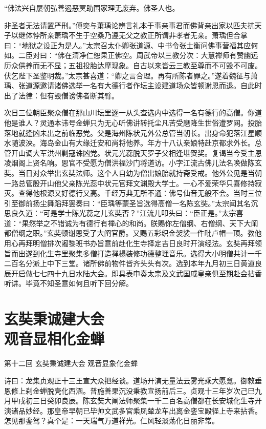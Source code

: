 \documentclass[12pt,UTF8]{ctexbook}
\begin{document}
{“佛法兴自屡朝弘善遏恶冥助国家理无废弃。佛圣人也。

非圣者无法请置严刑。”傅奕与萧瑀论辨言礼本于事亲事君而佛背亲出家以匹夫抗天子以继体悖所亲萧瑀不生于空桑乃遵无父之教正所谓非孝者无亲。萧瑀但合掌曰：“地狱之设正为是人。”太宗召太仆卿张道源、中书令张士衡问佛事营福其应何如。二臣对曰：“佛在清净仁恕果正佛空。周武帝以三教分次：大慧禅师有赞幽远历众供养而无不显；五祖投胎达摩现象。自古以来皆云三教至尊而不可毁不可废。伏乞陛下圣鉴明裁。”太宗甚喜道：“卿之言合理。再有所陈者罪之。”遂着魏征与萧瑀、张道源邀请诸佛选举一名有大德行者作坛主设建道场众皆顿谢恩而退。自此时出了法律：但有毁僧谤佛者断其臂。

次日三位朝臣聚众僧在那山川坛里逐一从头查选内中选得一名有德行的高僧。你道他是谁人？灵通本讳号金蝉只为无心听佛讲转托尘凡苦受磨降生世俗遭罗网。投胎落地就逢凶未出之前临恶党。父是海州陈状元外公总管当朝长。出身命犯落江星顺水随波泱。海岛金山有大缘迁安和尚将他养。年方十八认亲娘特赴京都求外长。总管开山调大军洪州剿寇诛凶党。状元光蕊脱天罗子父相逢堪贺奖。复谒当今受主恩凌烟阁上贤名响。恩官不受愿为僧洪福沙门将道访。小字江流古佛儿法名唤做陈玄奘。当日对众举出玄奘法师。这个人自幼为僧出娘胎就持斋受戒。他外公见是当朝一路总管殷开山他父亲陈光蕊中状元官拜文渊殿大学士。一心不爱荣华只喜修持寂灭。查得他根源又好德行又高。千经万典无所不通：佛号仙音无般不会。当时三位引至御前扬尘舞蹈拜罢奏曰：“臣瑀等蒙圣旨选得高僧一名陈玄奘。”太宗闻其名沉思良久道：“可是学士陈光蕊之儿玄奘否？”江流儿叩头曰：“臣正是。”太宗喜道：“果然举之不错诚为有德行有禅心的和尚。朕赐你左僧纲、右僧纲、天下大阐都僧纲之职。”玄奘顿谢恩受了大阐官爵。又赐五彩织金袈裟一件毗卢帽一顶。教他用心再拜明僧排次阇黎班书办旨意前赴化生寺择定吉日良时开演经法。玄奘再拜领旨而出遂到化生寺里聚集多僧打造禅榻装修功德整理音乐。选得大小明僧共计一千二百名分派上中下三堂。诸所佛前物件皆齐头头有次。选到本年九月初三日黄道良辰开启做七七四十九日水陆大会。即具表申奏太宗及文武国戚皇亲俱至期赴会拈香听讲。毕竟不知圣意如何且听下回分解。

\chapter[玄奘秉诚建大会\ 观音显相化金蝉]{玄奘秉诚建大会\\观音显相化金蝉}

第十二回 玄奘秉诚建大会 观音显象化金蝉

诗曰：龙集贞观正十三王宣大众把经谈。道场开演无量法云雾光乘大愿龛。御敕垂恩修上刹金蝉脱壳化西涵。普施善果沉没秉教宣扬前后三。贞观十三年岁次己巳九月甲戌初三日癸卯良辰。陈玄奘大阐法师聚集一千二百名高僧都在长安城化生寺开演诸品妙经。那皇帝早朝已毕帅文武多官乘凤辇龙车出离金銮宝殿径上寺来拈香。怎见那銮驾？真个是：一天瑞气万道祥光。仁风轻淡荡化日丽非常。

}
\end{document}
